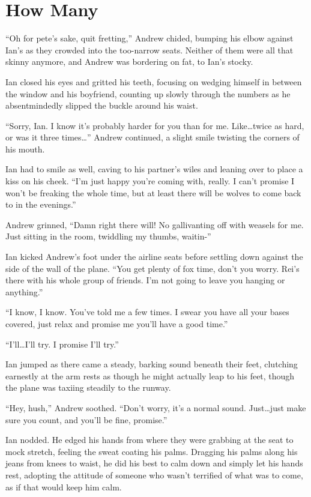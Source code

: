 \chapter{How Many}

``Oh for pete's sake, quit fretting,'' Andrew chided, bumping his elbow against Ian's as they crowded into the too-narrow seats. Neither of them were all that skinny anymore, and Andrew was bordering on fat, to Ian's stocky.

Ian closed his eyes and gritted his teeth, focusing on wedging himself in between the window and his boyfriend, counting up slowly through the numbers as he absentmindedly slipped the buckle around his waist.

``Sorry, Ian. I know it's probably harder for you than for me. Like\ldots{}twice as hard, or was it three times\ldots{}'' Andrew continued, a slight smile twisting the corners of his mouth.

Ian had to smile as well, caving to his partner's wiles and leaning over to place a kiss on his cheek. ``I'm just happy you're coming with, really. I can't promise I won't be freaking the whole time, but at least there will be wolves to come back to in the evenings.''

Andrew grinned, ``Damn right there will! No gallivanting off with weasels for me. Just sitting in the room, twiddling my thumbs, waitin-''

Ian kicked Andrew's foot under the airline seats before settling down against the side of the wall of the plane. ``You get plenty of fox time, don't you worry. Rei's there with his whole group of friends. I'm not going to leave you hanging or anything.''

``I know, I know. You've told me a few times. I swear you have all your bases covered, just relax and promise me you'll have a good time.''

``I'll\ldots{}I'll try. I promise I'll try.''

Ian jumped as there came a steady, barking sound beneath their feet, clutching earnestly at the arm rests as though he might actually leap to his feet, though the plane was taxiing steadily to the runway.

``Hey, hush,'' Andrew soothed. ``Don't worry, it's a normal sound. Just\ldots{}just make sure you count, and you'll be fine, promise.''

Ian nodded. He edged his hands from where they were grabbing at the seat to mock stretch, feeling the sweat coating his palms. Dragging his palms along his jeans from knees to waist, he did his best to calm down and simply let his hands rest, adopting the attitude of someone who wasn't terrified of what was to come, as if that would keep him calm.

